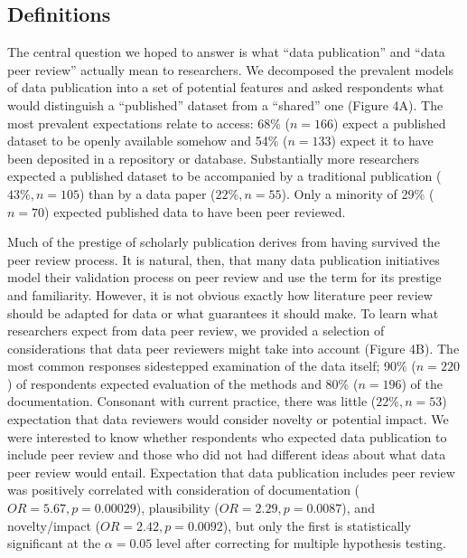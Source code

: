 \documentclass[10pt]{article}
\begin{document}
\subsection*{Definitions}

The central question we hoped to answer is what ``data publication'' and ``data peer review'' actually mean to researchers.
We decomposed the prevalent models of data publication into a set of potential features and asked respondents what would distinguish a ``published'' dataset from a ``shared'' one (Figure 4A).
The most prevalent expectations relate to access: 68\% ($n=166$) expect a published dataset to be openly available somehow and 54\% ($n=133$) expect it to have been deposited in a repository or database.
Substantially more researchers expected a published dataset to be accompanied by a traditional publication ($43\%, n=105$) than by a data paper ($22\%, n=55$).
Only a minority of 29\% ($n=70$) expected published data to have been peer reviewed.

Much of the prestige of scholarly publication derives from having survived the peer review process.
It is natural, then, that many data publication initiatives model their validation process on peer review and use the term for its prestige and familiarity.
However, it is not obvious exactly how literature peer review should be adapted for data or what guarantees it should make.
To learn what researchers expect from data peer review, we provided a selection of considerations that data peer reviewers might take into account (Figure 4B).
The most common responses sidestepped examination of the data itself; 90\% ($n=220$) of respondents expected evaluation of the methods and 80\% ($n=196$) of the documentation.
Consonant with current practice, there was little ($22\%, n=53$) expectation that data reviewers would consider novelty or potential impact.
We were interested to know whether respondents who expected data publication to include peer review and those who did not had different ideas about what data peer review would entail.  
Expectation that data publication includes peer review was positively correlated with consideration of documentation ($OR= 5.67, p=0.00029$), plausibility ($OR= 2.29, p=0.0087$), and novelty/impact ($OR= 2.42, p= 0.0092$), but only the first is statistically significant at the $\alpha= 0.05$ level after correcting for multiple hypothesis testing.
\end{document}
